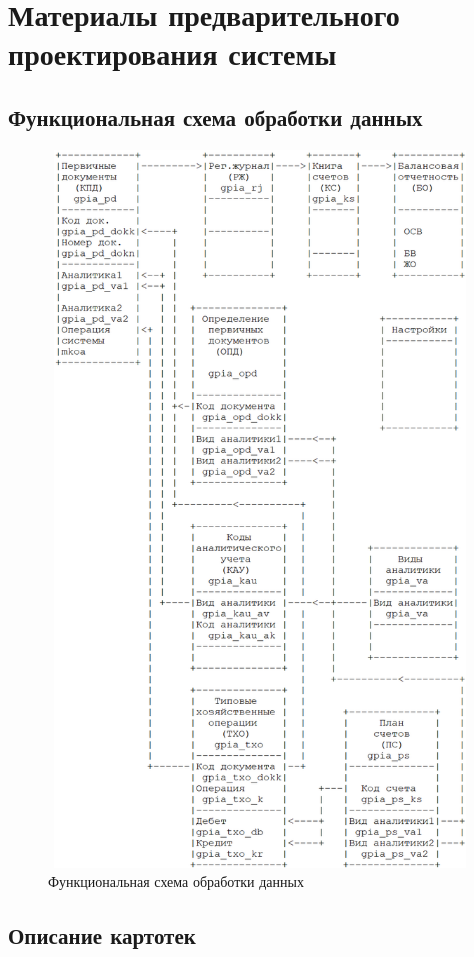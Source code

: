 \section{Материалы предварительного проектирования системы}
\subsection{Функциональная схема обработки данных}

\begin{figure}[!htbp]
    \centering
    \includegraphics[height=19cm, width=16cm]
        {_assets/gpia_part2.png}
    \caption{Функциональная схема обработки данных}
\end{figure}

\subsection{Описание картотек}

